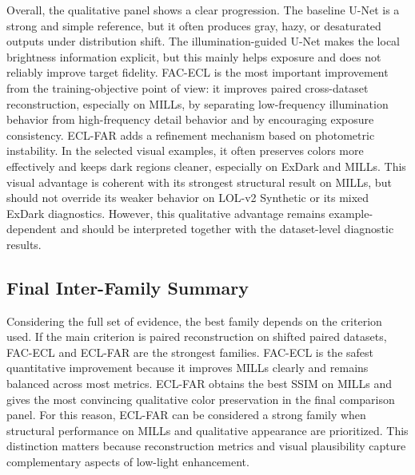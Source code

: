 Overall, the qualitative panel shows a clear progression. The baseline U-Net is a strong and simple reference, but it often produces gray, hazy, or desaturated outputs under distribution shift. The illumination-guided U-Net makes the local brightness information explicit, but this mainly helps exposure and does not reliably improve target fidelity. FAC-ECL is the most important improvement from the training-objective point of view: it improves paired cross-dataset reconstruction, especially on MILLs, by separating low-frequency illumination behavior from high-frequency detail behavior and by encouraging exposure consistency. ECL-FAR adds a refinement mechanism based on photometric instability. In the selected visual examples, it often preserves colors more effectively and keeps dark regions cleaner, especially on ExDark and MILLs. This visual advantage is coherent with its strongest structural result on MILLs, but should not override its weaker behavior on LOL-v2 Synthetic or its mixed ExDark diagnostics. However, this qualitative advantage remains example-dependent and should be interpreted together with the dataset-level diagnostic results.

\subsection{Final Inter-Family Summary}

Considering the full set of evidence, the best family depends on the criterion used. If the main criterion is paired reconstruction on shifted paired datasets, FAC-ECL and ECL-FAR are the strongest families. FAC-ECL is the safest quantitative improvement because it improves MILLs clearly and remains balanced across most metrics. ECL-FAR obtains the best SSIM on MILLs and gives the most convincing qualitative color preservation in the final comparison panel. For this reason, ECL-FAR can be considered a strong family when structural performance on MILLs and qualitative appearance are prioritized. This distinction matters because reconstruction metrics and visual plausibility capture complementary aspects of low-light enhancement.

